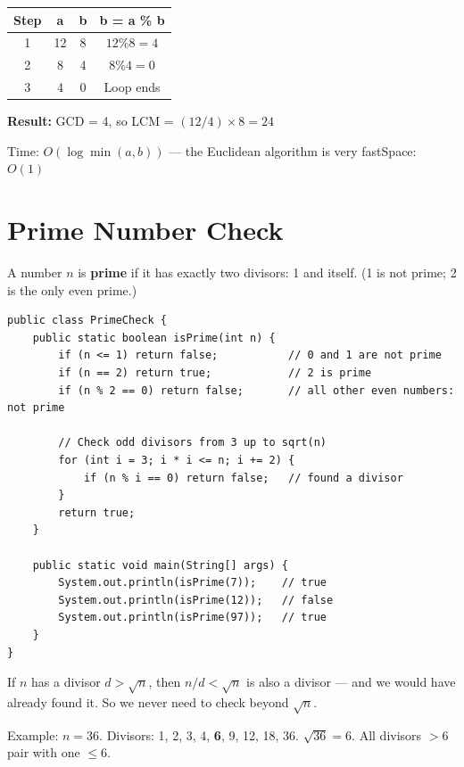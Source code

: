 \documentclass[12pt,a4paper,oneside]{book}
\begin{document}
\begin{dryrun}
\begin{center}
\begin{tabular}{cccc}
\toprule
\textbf{Step} & \textbf{a} & \textbf{b} & \textbf{b = a \% b}\\
\midrule
1 & 12 & 8 & $12 \% 8 = 4$\\
2 & 8  & 4 & $8 \% 4 = 0$\\
3 & 4  & 0 & Loop ends\\
\bottomrule
\end{tabular}
\end{center}
\textbf{Result:} GCD = 4, so LCM = $(12 / 4) \times 8 = 24$
\end{dryrun}

\begin{complexity}
Time: $O(\log \min(a,b))$ --- the Euclidean algorithm is very fast\quad Space: $O(1)$
\end{complexity}

\section{Prime Number Check}

A number $n$ is \textbf{prime} if it has exactly two divisors: 1 and itself. (1 is not prime; 2 is the only even prime.)

\begin{lstlisting}[caption={Is Prime? --- Optimised $O(\sqrt{n})$ check}]
public class PrimeCheck {
    public static boolean isPrime(int n) {
        if (n <= 1) return false;           // 0 and 1 are not prime
        if (n == 2) return true;            // 2 is prime
        if (n % 2 == 0) return false;       // all other even numbers: not prime

        // Check odd divisors from 3 up to sqrt(n)
        for (int i = 3; i * i <= n; i += 2) {
            if (n % i == 0) return false;   // found a divisor
        }
        return true;
    }

    public static void main(String[] args) {
        System.out.println(isPrime(7));    // true
        System.out.println(isPrime(12));   // false
        System.out.println(isPrime(97));   // true
    }
}
\end{lstlisting}

\begin{tipbox}
If $n$ has a divisor $d > \sqrt{n}$, then $n/d < \sqrt{n}$ is also a divisor --- and we would have already found it. So we never need to check beyond $\sqrt{n}$.

Example: $n = 36$. Divisors: 1, 2, 3, 4, \textbf{6}, 9, 12, 18, 36. $\sqrt{36} = 6$. All divisors $> 6$ pair with one $\leq 6$.
\end{tipbox}
\end{document}
